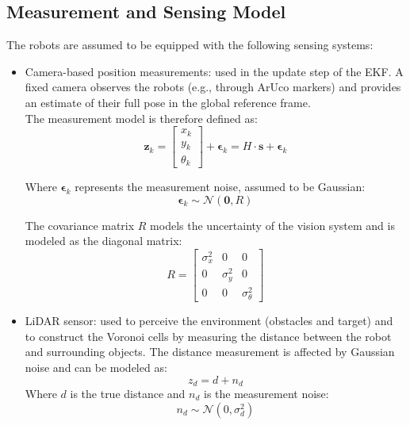 \documentclass[times, twoside]{zHenriquesLab-StyleBioRxiv}
\begin{document}
\subsection{Measurement and Sensing Model}

The robots are assumed to be equipped with the following sensing systems:

\begin{itemize}[noitemsep]
    
    \item Camera-based position measurements: used in the update step of the EKF. A fixed camera observes the robots (e.g., through ArUco markers) and provides an estimate of their full pose in the global reference frame.
    \\
    
    The measurement model is therefore defined as:
\begin{equation}
    \mathbf{z}_k =
    \begin{bmatrix}
        x_k \\
        y_k \\
        \theta_k
    \end{bmatrix}
    + \mathbf{\epsilon}_k = H\cdot \mathbf{s} + \mathbf{\epsilon}_k
\end{equation}

Where $\mathbf{\epsilon}_k$ represents the measurement noise, assumed to be Gaussian:
\begin{equation}
    \mathbf{\epsilon}_k \sim \mathcal{N}(\mathbf{0}, R)
\end{equation}

The covariance matrix $R$ models the uncertainty of the vision system and is modeled as the diagonal matrix:
\begin{equation}
    R =
    \begin{bmatrix}
        \sigma_x^2 & 0 & 0 \\
        0 & \sigma_y^2 & 0 \\
        0 & 0 & \sigma_\theta^2
    \end{bmatrix}
    \label{eq:R_matr}
\end{equation}

\item LiDAR sensor: used to perceive the environment (obstacles and target) and to construct the Voronoi cells by measuring the distance between the robot and surrounding objects. The distance measurement is affected by Gaussian noise and can be modeled as:
\begin{equation}
    z_d = d + n_d
\end{equation}
Where $d$ is the true distance and $n_d$ is the measurement noise:
\begin{equation}
    n_d \sim \mathcal{N}(0, \sigma_d^2)
    \label{eq:lidar_noise}
\end{equation}


\end{itemize}
\end{document}
